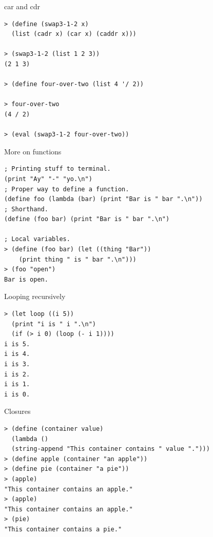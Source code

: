 \begin{frame}[fragile]{car and cdr}
\begin{verbatim}
> (define (swap3-1-2 x)
  (list (cadr x) (car x) (caddr x)))

> (swap3-1-2 (list 1 2 3))
(2 1 3)

> (define four-over-two (list 4 '/ 2))

> four-over-two
(4 / 2)

> (eval (swap3-1-2 four-over-two))
\end{verbatim}
\end{frame}

\begin{frame}[fragile]{More on functions}
\begin{verbatim}
; Printing stuff to terminal.
(print "Ay" "-" "yo.\n")
; Proper way to define a function.
(define foo (lambda (bar) (print "Bar is " bar ".\n"))
; Shorthand.
(define (foo bar) (print "Bar is " bar ".\n")

; Local variables.
> (define (foo bar) (let ((thing "Bar"))
    (print thing " is " bar ".\n")))
> (foo "open")
Bar is open.
\end{verbatim}
\end{frame}

\begin{frame}[fragile]{Looping recursively}
  \begin{verbatim}
> (let loop ((i 5))
  (print "i is " i ".\n")
  (if (> i 0) (loop (- i 1))))
i is 5.
i is 4.
i is 3.
i is 2.
i is 1.
i is 0.
\end{verbatim}
\end{frame}

\begin{frame}[fragile]{Closures}
  \begin{verbatim}
> (define (container value)
  (lambda ()
  (string-append "This container contains " value ".")))
> (define apple (container "an apple"))
> (define pie (container "a pie"))
> (apple)
"This container contains an apple."
> (apple)
"This container contains an apple."
> (pie)
"This container contains a pie."
\end{verbatim}
\end{frame}


